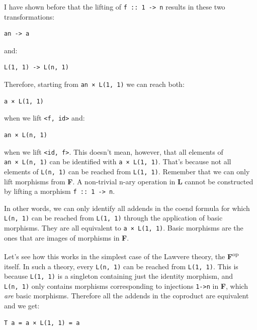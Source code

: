 I have shown before that the lifting of
\texttt{f\ ::\ 1\ -\textgreater{}\ n} results in these two
transformations:

\begin{verbatim}
an -> a
\end{verbatim}

and:

\begin{verbatim}
L(1, 1) -> L(n, 1)
\end{verbatim}

Therefore, starting from \texttt{an\ ×\ L(1,\ 1)} we can reach both:

\begin{verbatim}
a × L(1, 1)
\end{verbatim}

when we lift \texttt{\textless{}f,\ id\textgreater{}} and:

\begin{verbatim}
an × L(n, 1)
\end{verbatim}

when we lift \texttt{\textless{}id,\ f\textgreater{}}. This doesn't
mean, however, that all elements of \texttt{an\ ×\ L(n,\ 1)} can be
identified with \texttt{a\ ×\ L(1,\ 1)}. That's because not all elements
of \texttt{L(n,\ 1)} can be reached from \texttt{L(1,\ 1)}. Remember
that we can only lift morphisms from \textbf{F}. A non-trivial n-ary
operation in \textbf{L} cannot be constructed by lifting a morphism
\texttt{f\ ::\ 1\ -\textgreater{}\ n}.

In other words, we can only identify all addends in the coend formula
for which \texttt{L(n,\ 1)} can be reached from \texttt{L(1,\ 1)}
through the application of basic morphisms. They are all equivalent to
\texttt{a\ ×\ L(1,\ 1)}. Basic morphisms are the ones that are images of
morphisms in \textbf{F}.

Let's see how this works in the simplest case of the Lawvere theory, the
\textbf{F}\textsuperscript{op} itself. In such a theory, every
\texttt{L(n,\ 1)} can be reached from \texttt{L(1,\ 1)}. This is because
\texttt{L(1,\ 1)} is a singleton containing just the identity morphism,
and \texttt{L(n,\ 1)} only contains morphisms corresponding to
injections \texttt{1-\textgreater{}n} in \textbf{F}, which \emph{are}
basic morphisms. Therefore all the addends in the coproduct are
equivalent and we get:

\begin{verbatim}
T a = a × L(1, 1) = a
\end{verbatim}


